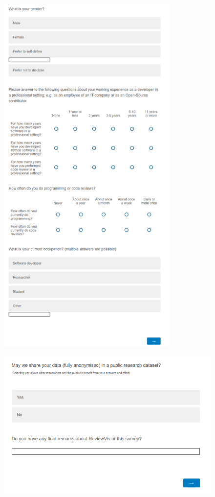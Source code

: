 \documentclass[a4paper,11pt,twoside]{article}
\theoremstyle{definition} %
\begin{document}
\begin{figure}[h]
    \centering
    \includegraphics[width=0.8\textwidth]{Subfigures/Appendices/Questionnaire/questionnaire_5.PNG}
\end{figure}

\begin{figure}[h]
    \centering
    \includegraphics[width=1.0\textwidth]{Subfigures/Appendices/Questionnaire/questionnaire_6.PNG}
\end{figure}
\end{document}
